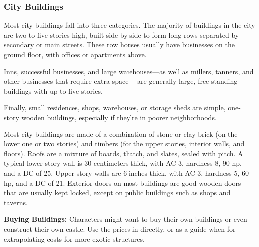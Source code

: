\subsubsection{City Buildings}
Most city buildings fall into three categories. The majority of buildings in the city are two to five stories high, built side by side to form long rows separated by secondary or main streets. These row houses usually have businesses on the ground floor, with offices or apartments above.

Inns, successful businesses, and large warehouses---as well as millers, tanners, and other businesses that require extra space--- are generally large, free-standing buildings with up to five stories.

Finally, small residences, shops, warehouses, or storage sheds are simple, one-story wooden buildings, especially if they're in poorer neighborhoods.

Most city buildings are made of a combination of stone or clay brick (on the lower one or two stories) and timbers (for the upper stories, interior walls, and floors). Roofs are a mixture of boards, thatch, and slates, sealed with pitch. A typical lower-story wall is 30 centimeters thick, with AC 3, hardness 8, 90 hp, and a  DC of 25. Upper-story walls are 6 inches thick, with AC 3, hardness 5, 60 hp, and a  DC of 21. Exterior doors on most buildings are good wooden doors that are usually kept locked, except on public buildings such as shops and taverns.

\textbf{Buying Buildings:} Characters might want to buy their own buildings or even construct their own castle. Use the prices in  directly, or as a guide when for extrapolating costs for more exotic structures.

